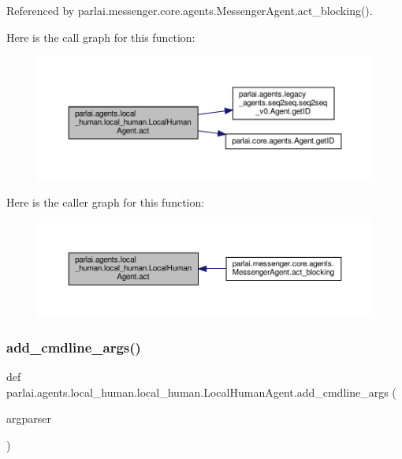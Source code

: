 Referenced by parlai.\+messenger.\+core.\+agents.\+Messenger\+Agent.\+act\+\_\+blocking().

Here is the call graph for this function\+:
\nopagebreak
\begin{figure}[H]
\begin{center}
\leavevmode
\includegraphics[width=350pt]{classparlai_1_1agents_1_1local__human_1_1local__human_1_1LocalHumanAgent_a8959f66f1f70152c13552f99f5b10067_cgraph}
\end{center}
\end{figure}
Here is the caller graph for this function\+:
\nopagebreak
\begin{figure}[H]
\begin{center}
\leavevmode
\includegraphics[width=350pt]{classparlai_1_1agents_1_1local__human_1_1local__human_1_1LocalHumanAgent_a8959f66f1f70152c13552f99f5b10067_icgraph}
\end{center}
\end{figure}
\mbox{\label{classparlai_1_1agents_1_1local__human_1_1local__human_1_1LocalHumanAgent_abc9993870cbd73a7706abef20021d6ca}} 
\subsubsection{\texorpdfstring{add\+\_\+cmdline\+\_\+args()}{add\_cmdline\_args()}}
{\footnotesize\ttfamily def parlai.\+agents.\+local\+\_\+human.\+local\+\_\+human.\+Local\+Human\+Agent.\+add\+\_\+cmdline\+\_\+args (\begin{DoxyParamCaption}\item[{}]{argparser }\end{DoxyParamCaption})}

